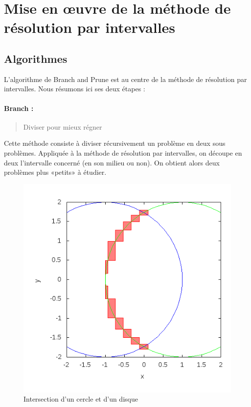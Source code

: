 \section{Mise en œuvre de la méthode de résolution par intervalles}



\subsection{Algorithmes}
L'algorithme de Branch and Prune  est au centre de la méthode de résolution par intervalles. Nous résumons ici ses deux étapes :  %
\paragraph{Branch :}
\begin{quote}Diviser pour mieux régner\end{quote} Cette méthode consiste à diviser récursivement un problème en deux sous problèmes. Appliquée à la méthode de résolution par intervalles, on découpe en deux l'intervalle concerné (en son milieu ou non). On obtient alors deux problèmes plus «petits» à étudier.%
\begin{figure}[h!] %
  \center
\includegraphics[scale=0.5]{img/circle-disk}
  \caption{Intersection d'un cercle et d'un disque} %
 \label{fig:CercleDisque} %
\end{figure} %
